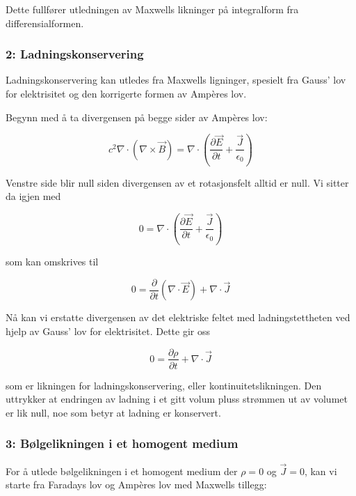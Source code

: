 Dette fullfører utledningen av Maxwells likninger på integralform fra differensialformen.

\subsubsection*{2: Ladningskonservering}
Ladningskonservering kan utledes fra Maxwells ligninger, spesielt fra Gauss' lov for elektrisitet og den korrigerte formen av Ampères lov.

Begynn med å ta divergensen på begge sider av Ampères lov:

\begin{equation*}
c^2 \nabla \cdot (\nabla \times \vec{B}) = \nabla \cdot \left(\frac{\partial \vec{E}}{\partial t} + \frac{\vec{J}}{\epsilon_0}\right)
\end{equation*}

Venstre side blir null siden divergensen av et rotasjonsfelt alltid er null. Vi sitter da igjen med

\begin{equation*}
0 = \nabla \cdot \left(\frac{\partial \vec{E}}{\partial t} + \frac{\vec{J}}{\epsilon_0}\right)
\end{equation*}

som kan omskrives til

\begin{equation*}
0 = \frac{\partial}{\partial t} (\nabla \cdot \vec{E}) + \nabla \cdot \vec{J}
\end{equation*}

Nå kan vi erstatte divergensen av det elektriske feltet med ladningstettheten ved hjelp av Gauss' lov for elektrisitet. Dette gir oss

\begin{equation*}
0 = \frac{\partial \rho}{\partial t} + \nabla \cdot \vec{J}
\end{equation*}

som er likningen for ladningskonservering, eller kontinuitetslikningen. Den uttrykker at endringen av ladning i et gitt volum pluss strømmen ut av volumet er lik null, noe som betyr at ladning er konservert.

\subsubsection*{3: Bølgelikningen i et homogent medium}
For å utlede bølgelikningen i et homogent medium der $\rho=0$ og $\vec{J}=0$, kan vi starte fra Faradays lov og Ampères lov med Maxwells tillegg:

